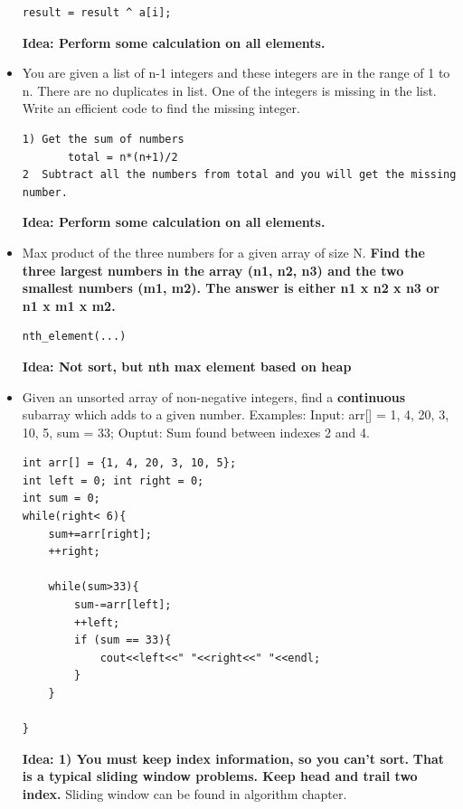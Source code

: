 \documentclass[a4paper,11pt,twoside]{book}
\begin{document}
\begin{itemize}
\begin{lstlisting}[breaklines]
	result = result ^ a[i];
\end{lstlisting}
\textbf{Idea: Perform some calculation on all elements. }


\item You are given a list of n-1 integers and these integers are in the range of 1 to n. There are no duplicates in list. One of the integers is missing in the list. Write an efficient code to find the missing integer.
\begin{lstlisting}[breaklines]
1) Get the sum of numbers 
       total = n*(n+1)/2
2  Subtract all the numbers from total and you will get the missing number.
\end{lstlisting}
\textbf{Idea: Perform some calculation on all elements. }

\item Max product of the three numbers for a given array of size N. \textbf{Find the three largest numbers in the array (n1, n2, n3) and the two smallest numbers (m1, m2). The answer is either n1 x n2 x n3 or n1 x m1 x m2.}
\begin{lstlisting}[breaklines]
nth_element(...)
\end{lstlisting}
\textbf{Idea: Not sort, but nth max element based on heap}

\item Given an unsorted array of non-negative integers, find a \textbf{continuous} subarray which adds to a given number.  Examples: Input: arr[] = {1, 4, 20, 3, 10, 5}, sum = 33; Ouptut: Sum found between indexes 2 and 4. 

\begin{lstlisting}[breaklines]
int arr[] = {1, 4, 20, 3, 10, 5};
int left = 0; int right = 0;
int sum = 0;
while(right< 6){
	sum+=arr[right];
	++right;
	
	while(sum>33){
		sum-=arr[left];
		++left;
		if (sum == 33){
			cout<<left<<" "<<right<<" "<<endl;
		}
	}
	
}
\end{lstlisting}
\textbf{Idea: 1) You must keep index information, so you can't sort. } \textbf{That is a typical sliding window problems. Keep head and trail two index. } Sliding window can be found in algorithm chapter. 


\end{itemize}
\end{document}
